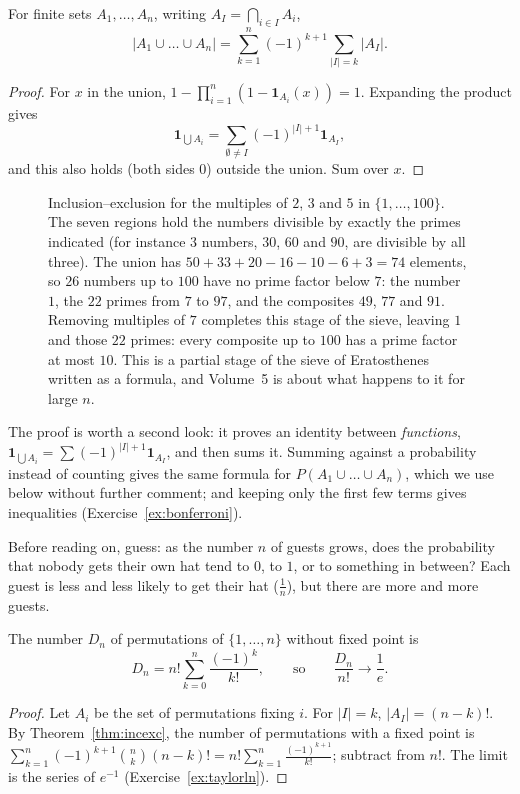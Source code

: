 \begin{theorem}\label{thm:incexc}
For finite sets $A_1,\dots,A_n$, writing $A_I=\bigcap_{i\in I}A_i$,
\[
\left|A_1\cup\dots\cup A_n\right|=\sum_{k=1}^n(-1)^{k+1}\sum_{|I|=k}|A_I|.
\]
\end{theorem}
\begin{proof}
For $x$ in the union, $1-\prod_{i=1}^n\left(1-\mathbf 1_{A_i}(x)\right)=1$. Expanding the product gives
\[\mathbf 1_{\bigcup A_i}=\sum_{\emptyset\ne I}(-1)^{|I|+1}\mathbf 1_{A_I},\]
and this also holds (both sides $0$) outside the union. Sum over $x$.
\end{proof}

\begin{figure}[ht]
\centering
{}
\caption{Inclusion--exclusion for the multiples of $2$, $3$ and $5$ in $\{1,\dots,100\}$. The seven regions hold the numbers divisible by exactly the primes indicated (for instance $3$ numbers, $30$, $60$ and $90$, are divisible by all three). The union has $50+33+20-16-10-6+3=74$ elements, so $26$ numbers up to $100$ have no prime factor below $7$: the number $1$, the $22$ primes from $7$ to $97$, and the composites $49$, $77$ and $91$. Removing multiples of $7$ completes this stage of the sieve, leaving $1$ and those $22$ primes: every composite up to $100$ has a prime factor at most $10$. This is a partial stage of the sieve of Eratosthenes written as a formula, and Volume~5 is about what happens to it for large $n$.}
\label{fig:venn}
\end{figure}

The proof is worth a second look: it proves an identity between \emph{functions}, $\mathbf 1_{\bigcup A_i}=\sum(-1)^{|I|+1}\mathbf 1_{A_I}$, and then sums it. Summing against a probability instead of counting gives the same formula for $P(A_1\cup\dots\cup A_n)$, which we use below without further comment; and keeping only the first few terms gives inequalities (Exercise~\ref{ex:bonferroni}).

\begin{think}
Before reading on, guess: as the number $n$ of guests grows, does the probability that nobody gets their own hat tend to $0$, to $1$, or to something in between? Each guest is less and less likely to get their hat ($\frac1n$), but there are more and more guests.
\end{think}

\begin{proposition}[derangements]\label{prop:derang}
The number $D_n$ of permutations of $\{1,\dots,n\}$ without fixed point is
\[
D_n=n!\sum_{k=0}^n\frac{(-1)^k}{k!},\qquad\text{so}\qquad\frac{D_n}{n!}\to\frac1e.
\]
\end{proposition}
\begin{proof}
Let $A_i$ be the set of permutations fixing $i$. For $|I|=k$, $|A_I|=(n-k)!$. By Theorem~\ref{thm:incexc}, the number of permutations with a fixed point is
$\sum_{k=1}^n(-1)^{k+1}\binom nk(n-k)!=n!\sum_{k=1}^n\frac{(-1)^{k+1}}{k!}$; subtract from $n!$. The limit is the series of $e^{-1}$ (Exercise~\ref{ex:taylorln}).
\end{proof}


